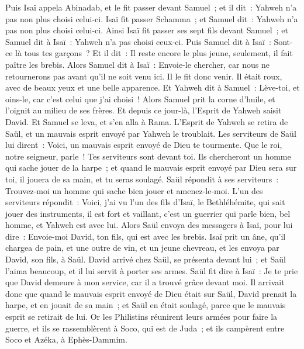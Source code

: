 \begin{multicols}{2}
Puis Isaï appela Abinadab, et le fit passer devant Samuel~; et il dit~: Yahweh n'a pas non plus choisi celui-ci.
Isaï fit passer Schamma~; et Samuel dit~: Yahweh n'a pas non plus choisi celui-ci.
Ainsi Isaï fit passer ses sept fils devant Samuel~; et Samuel dit à Isaï~: Yahweh n'a pas choisi ceux-ci.
Puis Samuel dit à Isaï~: Sont-ce là tous tes garçons~? Et il dit~: Il reste encore le plus jeune, seulement, il fait paître les brebis. Alors Samuel dit à Isaï~: Envoie-le chercher, car nous ne retournerons pas avant qu'il ne soit venu ici.
Il le fit donc venir. Il était roux, avec de beaux yeux et une belle apparence. Et Yahweh dit à Samuel~: Lève-toi, et oins-le, car c'est celui que j'ai choisi~!
Alors Samuel prit la corne d'huile, et l'oignit au milieu de ses frères. Et depuis ce jour-là, l'Esprit de Yahweh saisit David. Et Samuel se leva, et s'en alla à Rama.
L'Esprit de Yahweh se retira de Saül, et un mauvais esprit envoyé par Yahweh le troublait.
Les serviteurs de Saül lui dirent~: Voici, un mauvais esprit envoyé de Dieu te tourmente.
Que le roi, notre seigneur, parle~! Tes serviteurs sont devant toi. Ils chercheront un homme qui sache jouer de la harpe~; et quand le mauvais esprit envoyé par Dieu sera sur toi, il jouera de sa main, et tu seras soulagé.
Saül répondit à ses serviteurs~: Trouvez-moi un homme qui sache bien jouer et amenez-le-moi.
L'un des serviteurs répondit~: Voici, j'ai vu l'un des fils d'Isaï, le Bethléhémite, qui sait jouer des instruments, il est fort et vaillant, c'est un guerrier qui parle bien, bel homme, et Yahweh est avec lui.
Alors Saül envoya des messagers à Isaï, pour lui dire~: Envoie-moi David, ton fils, qui est avec les brebis.
Isaï prit un âne, qu'il chargea de pain, et une outre de vin, et un jeune chevreau, et les envoya par David, son fils, à Saül.
David arrivé chez Saül, se présenta devant lui~; et Saül l'aima beaucoup, et il lui servit à porter ses armes.
Saül fit dire à Isaï~: Je te prie que David demeure à mon service, car il a trouvé grâce devant moi.
Il arrivait donc que quand le mauvais esprit envoyé de Dieu était sur Saül, David prenait la harpe, et en jouait de sa main~; et Saül en était soulagé, parce que le mauvais esprit se retirait de lui.
\VerseOne{}Or les Philistins réunirent leurs armées pour faire la guerre, et ils se rassemblèrent à Soco, qui est de Juda~; et ils campèrent entre Soco et Azéka, à Ephès-Dammim.

\end{multicols}
